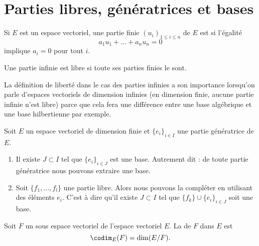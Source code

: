 
\section{Parties libres, génératrices et bases}

\begin{definition}
    Si \( E\) est un espace vectoriel, une partie finie \( (u_i)_{1\leq i\leq n}\) de \( E\) est  si l'égalité
    \begin{equation}
        a_1 u_1+\ldots +a_nu_n=0
    \end{equation}
    implique \( a_i=0\) pour tout \( i\).

    Une partie infinie est libre si toute ses parties finies le sont.
\end{definition}
La définition de liberté dans le cas des parties infinies a son importance lorsqu'on parle d'espaces vectoriels de dimension infinies (en dimension finie, aucune partie infinie n'est libre) parce que cela fera une différence entre une base algébrique et une base hilbertienne par exemple.

\begin{theorem} \label{ThoBaseIncompjblieG}
    Soit \( E\) un espace vectoriel de dimension finie et \( \{ e_i \}_{i\in I}\) une partie génératrice de \( E\).

    \begin{enumerate}
        \item
            Il existe \( J\subset I\) tel que \( \{ e_i \}_{i\in J}\) est une base. Autrement dit : de toute partie génératrice nous pouvons extraire une base.
        \item
            Soit \( \{ f_1,\ldots, f_l \}\) une partie libre. Alors nous pouvons la compléter en utilisant des éléments \( e_i\). C'est à dire qu'il existe \( J\subset I\) tel que \( \{ f_k \}\cup\{ e_i \}_{i\in J}\) soit une base.
    \end{enumerate}
\end{theorem}

Soit \( F\) un sous espace vectoriel de l'espace vectoriel \( E\). La  de \( F\) dans \( E\) est
\begin{equation}
    \codim_E(F)=\dim(E/F).
\end{equation}

